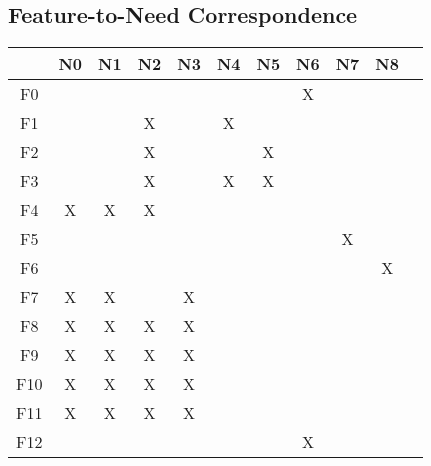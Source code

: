 \documentclass{article}
\begin{document}
\subsection{Feature-to-Need Correspondence}
\begin{tabular}{ | c || c | c | c | c | c | c | c | c | c | c | }
\hline
    & N0 & N1 & N2 & N3 & N4 & N5 & N6 & N7 & N8 \\
\hline
\hline
F0  &    &    &    &    &    &    & X  &    &    \\
\hline
F1  &    &    & X  &    & X  &    &    &    &    \\
\hline
F2  &    &    & X  &    &    & X  &    &    &    \\
\hline
F3  &    &    & X  &    & X  & X  &    &    &    \\
\hline
F4  & X  & X  & X  &    &    &    &    &    &    \\
\hline
F5  &    &    &    &    &    &    &    & X  &    \\
\hline
F6  &    &    &    &    &    &    &    &    & X  \\
\hline
F7  & X  & X  &    & X  &    &    &    &    &    \\
\hline
F8  & X  & X  & X  & X  &    &    &    &    &    \\
\hline
F9  & X  & X  & X  & X  &    &    &    &    &    \\
\hline
F10 & X  & X  & X  & X  &    &    &    &    &    \\
\hline
F11 & X  & X  & X  & X  &    &    &    &    &    \\
\hline
F12 &    &    &    &    &    &    & X  &    &    \\
\hline
\end{tabular}
\end{document}
